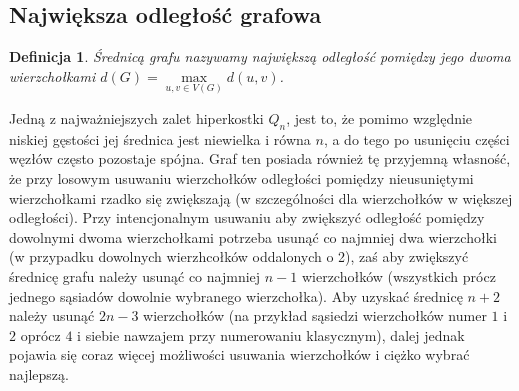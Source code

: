 \documentclass{pracamgr}
\newtheorem{defi}{Definicja}[section] %
\begin{document}
   \subsection{Największa odległość grafowa}%
    \begin{defi}\label{srednica grafu}
     \emph{Średnicą grafu} nazywamy największą odległość pomiędzy jego dwoma wierzchołkami $d(G)=\max\limits_{u,v\in V(G)}d(u,v)$.
    \end{defi}
    Jedną z najważniejszych zalet hiperkostki $Q_n$, jest to, że pomimo względnie niskiej gęstości jej średnica jest niewielka i równa $n$,
    a do tego po usunięciu części węzłów często pozostaje spójna.
    Graf ten posiada również tę przyjemną własność, że przy losowym usuwaniu wierzchołków odległości pomiędzy nieusuniętymi wierzchołkami rzadko się zwiększają
    (w szczególności dla wierzchołków w większej odległości).
    Przy intencjonalnym usuwaniu aby zwiększyć odległość pomiędzy dowolnymi dwoma wierzchołkami potrzeba usunąć co najmniej dwa wierzchołki
    (w przypadku dowolnych wierzhcołków oddalonych o 2), zaś aby zwiększyć średnicę grafu należy usunąć co najmniej $n-1$ wierzchołków
    (wszystkich prócz jednego sąsiadów dowolnie wybranego wierzchołka).
    Aby uzyskać średnicę $n+2$ należy usunąć $2n-3$ wierzchołków
    (na przykład sąsiedzi wierzchołków numer $1$ i $2$ oprócz $4$ i siebie nawzajem przy numerowaniu klasycznym),
    dalej jednak pojawia się coraz więcej możliwości usuwania wierzchołków i ciężko wybrać najlepszą.
    
\end{document}
